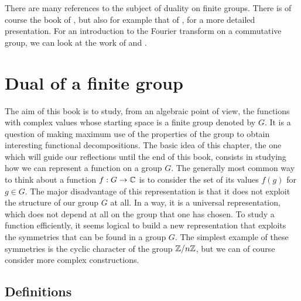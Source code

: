 There are many references to the subject of duality on finite groups. There is of course the book of  \cite{serre}, but also for example that of  \cite{warusfel}, for a more detailed presentation. For an introduction to the Fourier transform on a commutative group, we can look at the work of  and  \cite{dym}.

\section{Dual of a finite group}
\label{sect1-dual-group}

The aim of this book is to study, from an algebraic point of view, the functions with complex values whose starting space is a finite group denoted by $G$. It is a question of making maximum use of the properties of the group to obtain interesting functional decompositions. The basic idea of this chapter, the one which will guide our reflections until the end of this book, consists in studying how we can represent a function on a group $G$. The generally most common way to think about a function $ f: G \rightarrow \mathbb{C}$ is to consider the set of its values $ f(g)$ for $ g \in G$. The major disadvantage of this representation is that it does not exploit the structure of our group $G$ at all. In a way, it is a universal representation, which does not depend at all on the group that one has chosen. To study a function efficiently, it seems logical to build a new representation that exploits the symmetries that can be found in a group $G$. The simplest example of these symmetries is the cyclic character of the group $\mathbb{Z}/n\mathbb{Z}$, but we can of course consider more complex constructions.

\subsection{Definitions}

